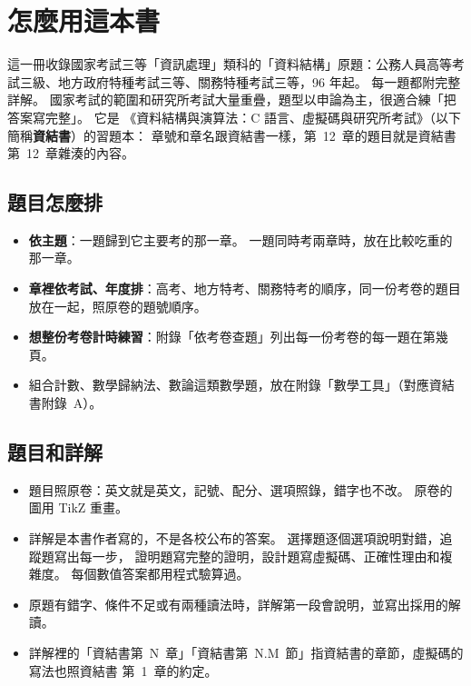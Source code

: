 \chapter*{怎麼用這本書}

這一冊收錄國家考試三等「資訊處理」類科的「資料結構」原題：公務人員高等考試三級、地方政府特種考試三等、關務特種考試三等，96 年起。 每一題都附完整詳解。 國家考試的範圍和研究所考試大量重疊，題型以申論為主，很適合練「把答案寫完整」。 它是
《資料結構與演算法：C 語言、虛擬碼與研究所考試》（以下簡稱\textbf{資結書}）的習題本：
章號和章名跟資結書一樣，第~12~章的題目就是資結書第~12~章雜湊的內容。

\section*{題目怎麼排}

\begin{itemize}
\item \textbf{依主題}：一題歸到它主要考的那一章。 一題同時考兩章時，放在比較吃重的那一章。
\item \textbf{章裡依考試、年度排}：高考、地方特考、關務特考的順序，同一份考卷的題目放在一起，照原卷的題號順序。
\item \textbf{想整份考卷計時練習}：附錄「依考卷查題」列出每一份考卷的每一題在第幾頁。
\item 組合計數、數學歸納法、數論這類數學題，放在附錄「數學工具」（對應資結書附錄~A）。
\end{itemize}

\section*{題目和詳解}

\begin{itemize}
\item 題目照原卷：英文就是英文，記號、配分、選項照錄，錯字也不改。 原卷的圖用 TikZ 重畫。
\item 詳解是本書作者寫的，不是各校公布的答案。 選擇題逐個選項說明對錯，追蹤題寫出每一步，
證明題寫完整的證明，設計題寫虛擬碼、正確性理由和複雜度。 每個數值答案都用程式驗算過。
\item 原題有錯字、條件不足或有兩種讀法時，詳解第一段會說明，並寫出採用的解讀。
\item 詳解裡的「資結書第~N~章」「資結書第~N.M~節」指資結書的章節，虛擬碼的寫法也照資結書
第~1~章的約定。
\end{itemize}

